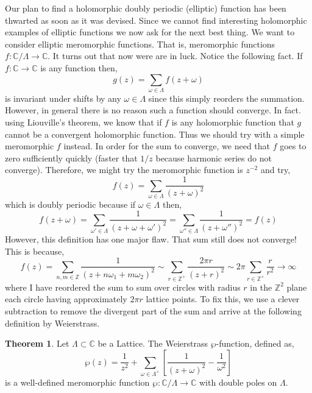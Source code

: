 \documentclass{article}
\newcommand{\Z}{\mathbb{Z}}
\newcommand{\C}{\mathbb{C}}
\theoremstyle{definition}
\newtheorem{theorem}{Theorem}[section]
\begin{document}
Our plan to find a holomorphic doubly periodic (elliptic) function has been thwarted as soon as it
was devised. Since we cannot find interesting holomorphic examples of elliptic functions we now ask
for the next best thing. We want to consider elliptic meromorphic functions. That is, meromorphic
functions $f : \C/\Lambda \to \C$. It turns out that now were are in luck. Notice the following fact. If
$f : \C \to \C$ is any function then,
\[ g(z) = \sum_{\omega \in \Lambda} f(z + \omega) \]
is invariant under shifts by any $\omega \in \Lambda$ since this simply reorders the summation. However, in general there is no reason such a function should converge. In fact. using Liouville’s theorem, we know that if $f$ is any holomorphic function that $g$ cannot be a convergent holomorphic function. Thus we
should try with a simple meromorphic $f$ instead. In order for the sum to converge, we need that $f$
goes to zero sufficiently quickly (faster that $1/z$ because harmonic series do not converge). Therefore,
we might try the meromorphic function is $z^{-2}$ and try,
\[ f(z) = \sum_{\omega \in \Lambda} \frac{1}{(z + \omega)^2} \]
which is doubly periodic because if $\omega \in \Lambda$ then,
\[ f(z + \omega) = \sum_{\omega' \in \Lambda} \frac{1}{(z + \omega + \omega')^2} = \sum_{\omega'' \in \Lambda} \frac{1}{(z + \omega'')^2} = f(z) \]
However, this definition has one major flaw. That sum still does not converge! This is because,
\[ f(z) = \sum_{n,m \in \Z} \frac{1}{(z + n \omega_1 + m \omega_2)^2} \sim \sum_{r \in \Z^{+}} \frac{2 \pi r}{(z + r)^2} \sim 2 \pi \sum_{r \in \Z^{+}} \frac{r}{r^2} \to \infty \]
where I have reordered the sum to sum over circles with radius $r$ in the $\Z^2$ plane each circle having approximately $2 \pi r$ lattice points. To fix this, we use a clever subtraction to remove the divergent part of the sum and arrive at the following definition by Weierstrass.


\begin{theorem}
Let $\Lambda \subset \C$ be a Lattice. The Weierstrass $\wp$-function, defined as,
\[ \wp(z) = \frac{1}{z^2} + \sum_{\omega \in \Lambda^\times } \left[ \frac{1}{(z + \omega)^2} - \frac{1}{\omega^2} \right] \]
is a well-defined meromorphic function $\wp : \C / \Lambda \to \C$ with double poles on $\Lambda$. 
\end{theorem}
\end{document}
